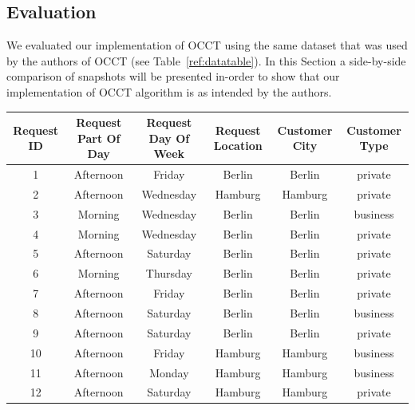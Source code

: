 \documentclass[a4paper,12pt]{article}
\begin{document}
\begin{spacing}{1.5}
\section{Evaluation}
We evaluated our implementation of OCCT using the same dataset that was used by the authors of OCCT (see Table~\ref{ref:datatable}). In this Section a side-by-side comparison of snapshots will be presented in-order to show that our implementation of OCCT algorithm is as intended by the authors.
\begin{table}[h]
\centering
\smaller
\begin{tabular}{|c|c|c|c|c|c|}\hline
  Request ID & Request Part Of Day & Request Day Of Week & Request Location & Customer City & Customer Type \\\hline
1          & Afternoon           & Friday              & Berlin           & Berlin        & private       \\\hline
2          & Afternoon           & Wednesday           & Hamburg          & Hamburg       & private       \\\hline
3          & Morning             & Wednesday           & Berlin           & Berlin        & business      \\\hline
4          & Morning             & Wednesday           & Berlin           & Berlin        & private       \\\hline
5          & Afternoon           & Saturday            & Berlin           & Berlin        & private       \\\hline
6          & Morning             & Thursday            & Berlin           & Berlin        & private       \\\hline
7          & Afternoon           & Friday              & Berlin           & Berlin        & private       \\\hline
8          & Afternoon           & Saturday            & Berlin           & Berlin        & business      \\\hline
9          & Afternoon           & Saturday            & Berlin           & Berlin        & private       \\\hline
10         & Afternoon           & Friday              & Hamburg          & Hamburg       & business      \\\hline
11         & Afternoon           & Monday              & Hamburg          & Hamburg       & business      \\\hline
12         & Afternoon           & Saturday            & Hamburg          & Hamburg       & private       \\\hline

\end{tabular}
\end{table}
\end{spacing}
\end{document}
